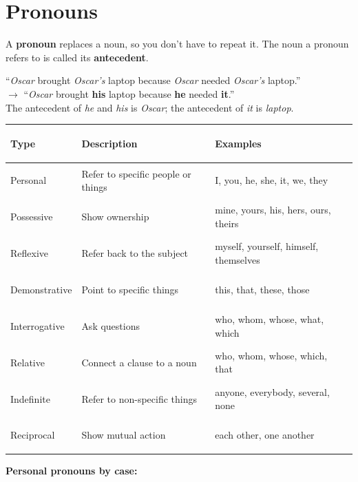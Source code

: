 \documentclass[11pt, letterpaper]{article}
\newcommand{\example}[1]{%
  \begin{tcolorbox}[colback=exbg, colframe=exborder,
    title={\bfseries Example}, arc=3pt, boxrule=1pt]
  #1
  \end{tcolorbox}%
}
\begin{document}
\section*{Pronouns}

A \textbf{pronoun} replaces a noun, so you don't have to repeat it. The noun a pronoun
refers to is called its \textbf{antecedent}.

\example{
``\emph{Oscar} brought \emph{Oscar's} laptop because \emph{Oscar} needed \emph{Oscar's} laptop.''\\
$\to$ ``\emph{Oscar} brought \textbf{his} laptop because \textbf{he} needed \textbf{it}.''\\[4pt]
The antecedent of \emph{he} and \emph{his} is \emph{Oscar}; the antecedent of \emph{it} is \emph{laptop}.
}

\noindent
{\small\renewcommand{\arraystretch}{1.5}
\begin{tabularx}{\textwidth}{>{\bfseries\raggedright\arraybackslash}p{2.7cm}
                              >{\raggedright\arraybackslash}X
                              >{\raggedright\arraybackslash}p{4.5cm}}
\toprule
\rowcolor{tableheader}
\textbf{Type} & \textbf{Description} & \textbf{Examples} \\
\midrule
\rowcolor{rowA}  Personal       & Refer to specific people or things  & I, you, he, she, it, we, they \\
\rowcolor{rowB}  Possessive     & Show ownership                       & mine, yours, his, hers, ours, theirs \\
\rowcolor{rowA}  Reflexive      & Refer back to the subject            & myself, yourself, himself, themselves \\
\rowcolor{rowB}  Demonstrative  & Point to specific things             & this, that, these, those \\
\rowcolor{rowA}  Interrogative  & Ask questions                         & who, whom, whose, what, which \\
\rowcolor{rowB}  Relative       & Connect a clause to a noun            & who, whom, whose, which, that \\
\rowcolor{rowA}  Indefinite     & Refer to non-specific things          & anyone, everybody, several, none \\
\rowcolor{rowB}  Reciprocal     & Show mutual action                   & each other, one another \\
\bottomrule
\end{tabularx}}

\textbf{Personal pronouns by case:}
\end{document}
